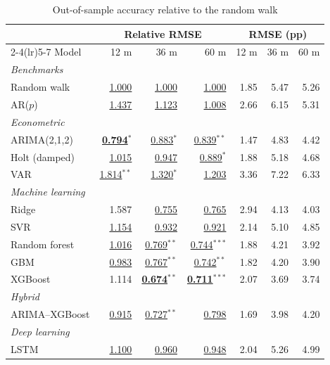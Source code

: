 \begin{table}[!ht]\centering\small
\caption{Out-of-sample accuracy relative to the random walk}\label{tab:main}
\begin{tabular}{l rrr rrr}\toprule
 & \multicolumn{3}{c}{Relative RMSE} & \multicolumn{3}{c}{RMSE (pp)}\\\cmidrule(lr){2-4}\cmidrule(lr){5-7}
Model & 12 m & 36 m & 60 m & 12 m & 36 m & 60 m\\\midrule
\multicolumn{7}{l}{\textit{Benchmarks}}\\
\quad Random walk & \underline{1.000} & \underline{1.000} & \underline{1.000} & 1.85 & 5.47 & 5.26\\
\quad AR($p$) & \underline{1.437} & \underline{1.123} & \underline{1.008} & 2.66 & 6.15 & 5.31\\
\multicolumn{7}{l}{\textit{Econometric}}\\
\quad ARIMA(2,1,2) & \textbf{\underline{0.794$^{*}$}} & \underline{0.883$^{*}$} & \underline{0.839$^{**}$} & 1.47 & 4.83 & 4.42\\
\quad Holt (damped) & \underline{1.015} & \underline{0.947} & \underline{0.889$^{*}$} & 1.88 & 5.18 & 4.68\\
\quad VAR & \underline{1.814$^{**}$} & \underline{1.320$^{*}$} & \underline{1.203} & 3.36 & 7.22 & 6.33\\
\multicolumn{7}{l}{\textit{Machine learning}}\\
\quad Ridge & 1.587 & \underline{0.755} & \underline{0.765} & 2.94 & 4.13 & 4.03\\
\quad SVR & \underline{1.154} & \underline{0.932} & \underline{0.921} & 2.14 & 5.10 & 4.85\\
\quad Random forest & \underline{1.016} & \underline{0.769$^{**}$} & \underline{0.744$^{***}$} & 1.88 & 4.21 & 3.92\\
\quad GBM & \underline{0.983} & \underline{0.767$^{**}$} & \underline{0.742$^{**}$} & 1.82 & 4.20 & 3.90\\
\quad XGBoost & 1.114 & \textbf{\underline{0.674$^{**}$}} & \textbf{\underline{0.711$^{***}$}} & 2.07 & 3.69 & 3.74\\
\multicolumn{7}{l}{\textit{Hybrid}}\\
\quad ARIMA--XGBoost & \underline{0.915} & \underline{0.727$^{**}$} & \underline{0.798} & 1.69 & 3.98 & 4.20\\
\multicolumn{7}{l}{\textit{Deep learning}}\\
\quad LSTM & \underline{1.100} & \underline{0.960} & \underline{0.948} & 2.04 & 5.26 & 4.99\\

\end{tabular}
\end{table}
